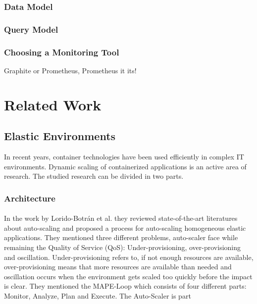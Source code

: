 \subsubsection{Data Model}


\subsubsection{Query Model}


\subsubsection{Choosing a Monitoring Tool}
Graphite or Prometheus, Prometheus it its!




\section{Related Work}
\subsection{Elastic Environments}
In recent years, container technologies have been used efficiently in complex IT environments. Dynamic scaling of containerized applications is an active area of research. The studied research can be divided in two parts. 


\subsubsection{Architecture}
\paragraph{} In the work by Lorido-Botrán et al.  they reviewed state-of-the-art literatures about auto-scaling and proposed a process for auto-scaling homogeneous elastic applications. They mentioned three different problems, auto-scaler face while remaining the Quality of Service (QoS): Under-provisioning, over-provisioning and oscillation. Under-provisioning refers to, if not enough resources are available, over-provisioning means that more resources are available than needed and oscillation occurs when the environment gets scaled too quickly before the impact is clear. They mentioned the MAPE-Loop which consists of four different parts: Monitor, Analyze, Plan and Execute.  The Auto-Scaler is part 


